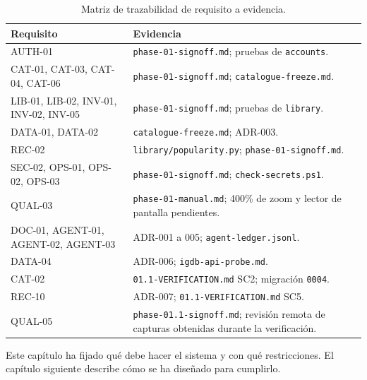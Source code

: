 \begin{table}[H]
\centering
\begin{tabularx}{\textwidth}{ | L{0.42\textwidth} | Y | }
    \hline
    \textbf{Requisito} & \textbf{Evidencia} \\
    \hline
    AUTH-01 & \texttt{phase-01-signoff.md}; pruebas de \texttt{accounts}. \\
    \hline
    CAT-01, CAT-03, CAT-04, CAT-06 & \texttt{phase-01-signoff.md}; \texttt{catalogue-freeze.md}. \\
    \hline
    LIB-01, LIB-02, INV-01, INV-02, INV-05 & \texttt{phase-01-signoff.md}; pruebas de \texttt{library}. \\
    \hline
    DATA-01, DATA-02 & \texttt{catalogue-freeze.md}; ADR-003. \\
    \hline
    REC-02 & \texttt{library/popularity.py}; \texttt{phase-01-signoff.md}. \\
    \hline
    SEC-02, OPS-01, OPS-02, OPS-03 & \texttt{phase-01-signoff.md}; \texttt{check-secrets.ps1}. \\
    \hline
    QUAL-03 & \texttt{phase-01-manual.md}; 400\% de zoom y lector de pantalla pendientes. \\
    \hline
    DOC-01, AGENT-01, AGENT-02, AGENT-03 & ADR-001 a 005; \texttt{agent-ledger.jsonl}. \\
    \hline
    DATA-04 & ADR-006; \texttt{igdb-api-probe.md}. \\
    \hline
    CAT-02 & \texttt{01.1-VERIFICATION.md} SC2; migración \texttt{0004}. \\
    \hline
    REC-10 & ADR-007; \texttt{01.1-VERIFICATION.md} SC5. \\
    \hline
    QUAL-05 & \texttt{phase-01.1-signoff.md}; revisión remota de capturas obtenidas durante la verificación. \\
    \hline
\end{tabularx}
\caption{Matriz de trazabilidad de requisito a evidencia.}
\label{tab:trazabilidad}
\end{table}

Este capítulo ha fijado qué debe hacer el sistema y con qué restricciones. El capítulo
siguiente describe cómo se ha diseñado para cumplirlo.
